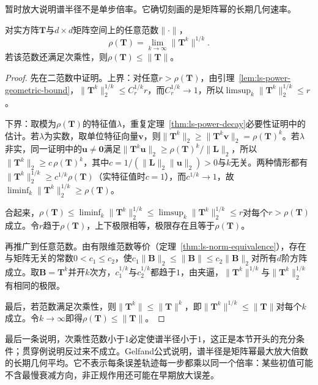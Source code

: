 暂时放大说明谱半径不是单步倍率。它确切刻画的是矩阵幂的长期几何速率。
\begin{theorem}[Gelfand公式]
\label{thm:ls-gelfand-formula}
对实方阵$\bm T$与$d\times d$矩阵空间上的任意范数$\lVert\cdot\rVert$，
\begin{equation}
 \rho(\bm T)=\lim_{k\to\infty}\lVert\bm T^k\rVert^{1/k}.
 \label{eq:ls-gelfand-formula}
\end{equation}
若该范数还满足次乘性，则$\rho(\bm T)\leq\lVert\bm T\rVert$。
\end{theorem}
\begin{proof}
先在二范数中证明。上界：对任意$r>\rho(\bm T)$，由引理~\ref{lem:ls-power-geometric-bound}，$\lVert\bm T^k\rVert_2^{1/k}\leq C_r^{1/k}r$，而$C_r^{1/k}\to1$，所以$\limsup_k\lVert\bm T^k\rVert_2^{1/k}\leq r$。

下界：取模为$\rho(\bm T)$的特征值$\lambda$，重复定理~\ref{thm:ls-power-decay}必要性证明中的估计。若$\lambda$为实数，取单位特征向量$\bm v$，则$\lVert\bm T^k\rVert_2\geq\lVert\bm T^k\bm v\rVert_2=\rho(\bm T)^k$。若$\lambda$非实，同一证明中的$\bm u\neq\bm0$满足$\lVert\bm T^k\bm u\rVert_2\geq\rho(\bm T)^k/\lVert\bm L\rVert_2$，所以$\lVert\bm T^k\rVert_2\geq c\,\rho(\bm T)^k$，其中$c=1/(\lVert\bm L\rVert_2\lVert\bm u\rVert_2)>0$与$k$无关。两种情形都有$\lVert\bm T^k\rVert_2^{1/k}\geq c^{1/k}\rho(\bm T)$（实特征值时$c=1$），而$c^{1/k}\to1$，故$\liminf_k\lVert\bm T^k\rVert_2^{1/k}\geq\rho(\bm T)$。

合起来，$\rho(\bm T)\leq\liminf_k\lVert\bm T^k\rVert_2^{1/k}\leq\limsup_k\lVert\bm T^k\rVert_2^{1/k}\leq r$对每个$r>\rho(\bm T)$成立。令$r$趋于$\rho(\bm T)$，上下极限相等，极限存在且等于$\rho(\bm T)$。

再推广到任意范数。由有限维范数等价（定理~\ref{thm:ls-norm-equivalence}），存在与矩阵无关的常数$0<c_1\leq c_2$，使$c_1\lVert\bm B\rVert_2\leq\lVert\bm B\rVert\leq c_2\lVert\bm B\rVert_2$对所有$d$阶方阵成立。取$\bm B=\bm T^k$并开$k$次方，$c_1^{1/k}$与$c_2^{1/k}$都趋于$1$，由夹逼，$\lVert\bm T^k\rVert^{1/k}$与$\lVert\bm T^k\rVert_2^{1/k}$有相同的极限。

最后，若范数满足次乘性，则$\lVert\bm T^k\rVert\leq\lVert\bm T\rVert^k$，即$\lVert\bm T^k\rVert^{1/k}\leq\lVert\bm T\rVert$对每个$k$成立。令$k\to\infty$即得$\rho(\bm T)\leq\lVert\bm T\rVert$。
\end{proof}
最后一条说明，次乘性范数小于$1$必定使谱半径小于$1$，这正是本节开头的充分条件；贯穿例说明反过来不成立。Gelfand公式说明，谱半径是矩阵幂最大放大倍数的长期几何平均。它不表示每条误差轨迹每一步都乘以同一个倍率：某些初值可能不含最慢衰减方向，非正规作用还可能在早期放大误差。

